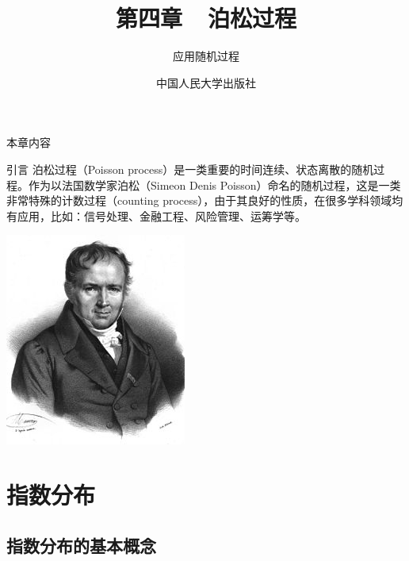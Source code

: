 \documentclass[t]{beamer}
\begin{document}
\fontsize{11}{18}\selectfont


\CTEXindent



  \title{第四章~~泊松过程}
\author{应用随机过程}
\date{中国人民大学出版社}
  \begin{frame}
    \maketitle
  \end{frame}

\begin{frame}{本章内容}
  \begin{multicols}{2}
    \tableofcontents
  \end{multicols}
\end{frame}

\begin{frame}{引言}
    泊松过程（Poisson process）是一类重要的时间连续、状态离散的随机过程。作为以法国数学家泊松（Simeon Denis Poisson）命名的随机过程，这是一类非常特殊的计数过程（counting process），由于其良好的性质，在很多学科领域均有应用，比如：信号处理、金融工程、风险管理、运筹学等。
    
\begin{center}
\includegraphics[height=.45\textheight]{fig/poisson.jpg}
\end{center}

\end{frame}


\section{指数分布}
\subsection{指数分布的基本概念}
\end{document}
